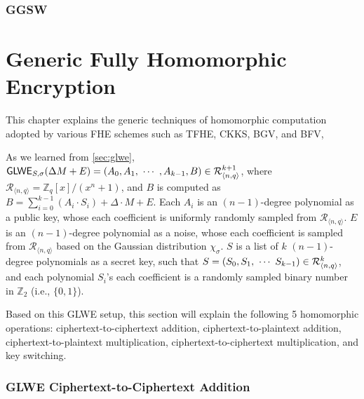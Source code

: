 \documentclass[11pt]{article}
\begin{document}
\clearpage

\section{GGSW}
\label{sec:ggsw}


\clearpage


\part{Generic Fully Homomorphic Encryption}
\label{part:generic-fhe}

\renewcommand{\thesection}{C-\arabic{section}}
\setcounter{section}{0}

This chapter explains the generic techniques of homomorphic computation adopted by various FHE schemes such as TFHE, CKKS, BGV, and BFV,

As we learned from \autoref{sec:glwe}, $\textsf{GLWE}_{S,\sigma}(\Delta M + E) = (A_0, A_1, \text{ } \text{$\cdots$} \text{ } , A_{k-1}, B) \in \mathcal{R}_{\langle n, q \rangle }^{k + 1}$, where $\mathcal{R}_{\langle n,q \rangle} = \mathbb{Z}_q[x] / (x^n + 1)$, and $B$ is computed as $B = \sum\limits_{i=0}^{k-1}{(A_i \cdot S_i)} + \Delta \cdot M + E$. Each $A_i$ is an $(n-1)$-degree polynomial as a public key, whose each coefficient is uniformly randomly sampled from $\mathcal{R}_{\langle n, q \rangle }$. $E$ is an $(n-1)$-degree polynomial as a noise, whose each coefficient is sampled from $\mathcal{R}_{\langle n, q \rangle }$ based on the Gaussian distribution $\chi_\sigma$. $S$ is a list of $k$ $(n-1)$-degree polynomials as a secret key, such that $S = (S_0, S_1, \text{ } \text{$\cdots$} \text{ } S_{k-1} ) \in \mathcal{R}_{\langle n, q \rangle }^k$, and each polynomial $S_i$'s each coefficient is a randomly sampled binary number in $\mathbb{Z}_2$ (i.e., $\{0, 1\}$). 

Based on this GLWE setup, this section will explain the following 5 homomorphic operations: ciphertext-to-ciphertext addition, ciphertext-to-plaintext addition, ciphertext-to-plaintext multiplication, ciphertext-to-ciphertext multiplication, and key switching. 


\clearpage


\section{GLWE Ciphertext-to-Ciphertext Addition}
\label{sec:glwe-add-cipher}


\clearpage
\end{document}
